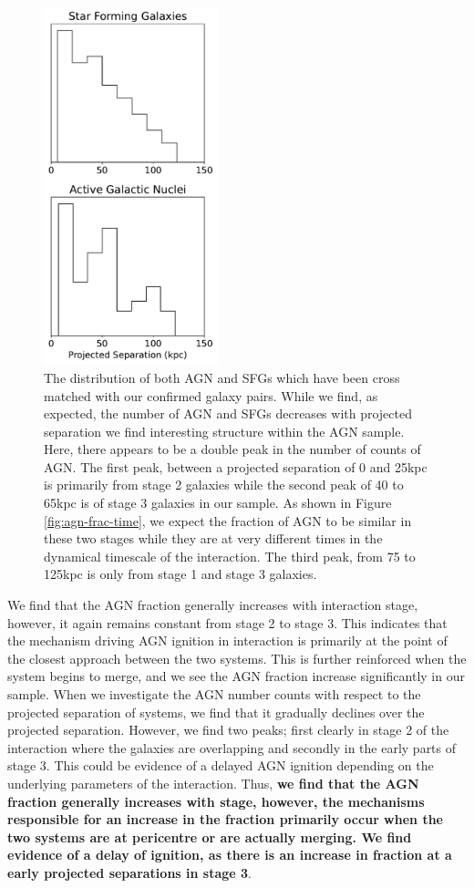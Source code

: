 \begin{figure}
    \centering
    \includegraphics[width=0.45\textwidth]{Chapter3/figures/sfg-agn-dist.pdf}
    \caption{The distribution of both AGN and SFGs which have been cross matched with our confirmed galaxy pairs. While we find, as expected, the number of AGN and SFGs decreases with projected separation we find interesting structure within the AGN sample. Here, there appears to be a double peak in the number of counts of AGN. The first peak, between a projected separation of 0 and 25kpc is primarily from stage 2 galaxies while the second peak of 40 to 65kpc is of stage 3 galaxies in our sample. As shown in Figure \ref{fig:agn-frac-time}, we expect the fraction of AGN to be similar in these two stages while they are at very different times in the dynamical timescale of the interaction. The third peak, from 75 to 125kpc is only from stage 1 and stage 3 galaxies.}
    \label{fig:sfg-agn-proj}
\end{figure}

We find that the AGN fraction generally increases with interaction stage, however, it again remains constant from stage 2 to stage 3. This indicates that the mechanism driving AGN ignition in interaction is primarily at the point of the closest approach between the two systems. This is further reinforced when the system begins to merge, and we see the AGN fraction increase significantly in our sample. When we investigate the AGN number counts with respect to the projected separation of systems, we find that it gradually declines over the projected separation. However, we find two peaks; first clearly in stage 2 of the interaction where the galaxies are overlapping and secondly in the early parts of stage 3. This could be evidence of a delayed AGN ignition depending on the underlying parameters of the interaction. Thus, \textbf{we find that the AGN fraction generally increases with stage, however, the mechanisms responsible for an increase in the fraction primarily occur when the two systems are at pericentre or are actually merging. We find evidence of a delay of ignition, as there is an increase in fraction at a early projected separations in stage 3}.

